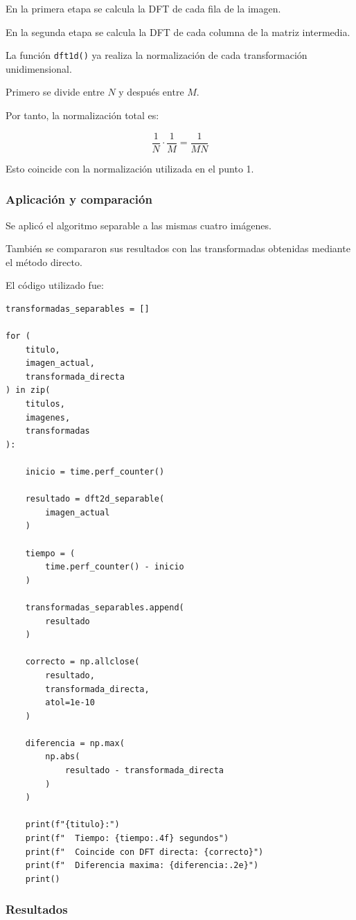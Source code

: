 \documentclass[11pt,letterpaper]{article}
\begin{document}
En la primera etapa se calcula la DFT
de cada fila de la imagen.

En la segunda etapa se calcula la DFT
de cada columna de la matriz intermedia.

La función \texttt{dft1d()} ya realiza
la normalización de cada transformación
unidimensional.

Primero se divide entre $N$
y después entre $M$.

Por tanto, la normalización total es:

\[
\frac{1}{N}\cdot\frac{1}{M}
=
\frac{1}{MN}
\]

Esto coincide con la normalización
utilizada en el punto 1.

\subsubsection*{Aplicación y comparación}

Se aplicó el algoritmo separable
a las mismas cuatro imágenes.

También se compararon sus resultados
con las transformadas obtenidas
mediante el método directo.

El código utilizado fue:

\begin{lstlisting}
transformadas_separables = []

for (
    titulo,
    imagen_actual,
    transformada_directa
) in zip(
    titulos,
    imagenes,
    transformadas
):

    inicio = time.perf_counter()

    resultado = dft2d_separable(
        imagen_actual
    )

    tiempo = (
        time.perf_counter() - inicio
    )

    transformadas_separables.append(
        resultado
    )

    correcto = np.allclose(
        resultado,
        transformada_directa,
        atol=1e-10
    )

    diferencia = np.max(
        np.abs(
            resultado - transformada_directa
        )
    )

    print(f"{titulo}:")
    print(f"  Tiempo: {tiempo:.4f} segundos")
    print(f"  Coincide con DFT directa: {correcto}")
    print(f"  Diferencia maxima: {diferencia:.2e}")
    print()
\end{lstlisting}

\subsubsection*{Resultados}
\end{document}
